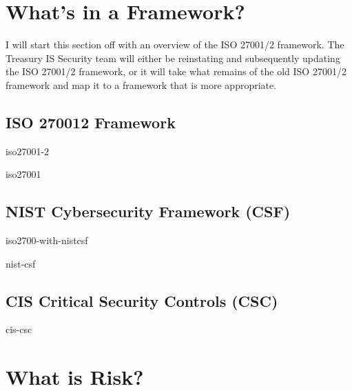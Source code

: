 \documentclass[12pt]{article}
\begin{document}
                    
                              
                       
                              
                              
                                        
                                        
\cleardoublepage

     \section{What's in a Framework?}

          I will start this section off with an overview of the ISO 27001/2 framework. The Treasury IS Security team will either be
          reinstating and subsequently updating the ISO 27001/2 framework, or it will take what remains of the old ISO 27001/2
          framework and map it to a framework that is more appropriate.

                              \subsection{ISO 270012 Framework}

                                        {iso27001-2}

                                        {iso27001}

                              \subsection{NIST Cybersecurity Framework (CSF)}

                                        {iso2700-with-nistcsf}

                                        {nist-csf}

                              \subsection{CIS Critical Security Controls (CSC)}

                                        {cis-csc}

     \section{What is Risk?}
\end{document}
